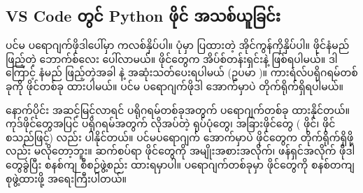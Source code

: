 \clearpage


\subsection*{VS Code တွင် Python ဖိုင် အသစ်ယူခြင်း}
 ပင်မ ပရောဂျက်ဖိုဒါပေါ်မှာ ကလစ်နှိပ်ပါ။ ပုံမှာ ပြထားတဲ့  အိုင်ကွန်ကိုနှိပ်ပါ။ ဖိုင်နံမည်ဖြည့်တဲ့ ဘောက်စ်လေး ပေါ်လာမယ်။  ဖိုင်တွေက  အိပ်စ်တန်းရှင်းနဲ့ ဖြစ်ရပါမယ်။ ဒါကြောင့် နံမည် ဖြည့်တဲ့အခါ  နဲ့ အဆုံးသတ်ပေးရပါမယ် (ဥပမာ )။ ကားရဲလ်ပရိုဂရမ်တစ်ခုကို  ဖိုင်တစ်ခု ထားပါမယ်။ ပင်မ ပရောဂျက်ဖိုဒါ အောက်မှာပဲ တိုက်ရိုက်ရှိရပါမယ်။ 

နောက်ပိုင်း အဆင့်မြင့်လာရင် ပရိုဂရမ်တစ်ခုအတွက် ပရောဂျက်တစ်ခု ထားနိုင်တယ်။ ကုဒ်ဖိုင်တွေအပြင် ပရိုဂရမ်အတွက် လိုအပ်တဲ့ ရုပ်ပုံတွေ၊ အခြားဖိုင်တွေ ( ဖိုင်၊  ဖိုင် စသည်ဖြင့်) လည်း ပါနိုင်တယ်။ ပင်မပရောဂျက် အောက်မှာပဲ  ဖိုင်တွေက တိုက်ရိုက်ရှိဖို့လည်း မလိုတော့ဘူး။  ဆက်{\allowbreak}စပ်ရာ ဖိုင်တွေကို အမျိုးအစားအလိုက်၊  ဖန်ရှင်အလိုက် ဖိုဒါတွေခွဲပြီး  စနစ်ကျ စီစဉ်ဖွဲ့စည်း ထားရမှာပါ။ ပရောဂျက်တစ်ခုမှာ ဖိုင်တွေကို စနစ်တကျ စုဖွဲ့ထားဖို့ အရေးကြီးပါတယ်။

\begin{figure}[tbh!]
\caption{} 
\label{fig:vsnewfile}
\end{figure}

\clearpage








\afterpage{\blankpage}
